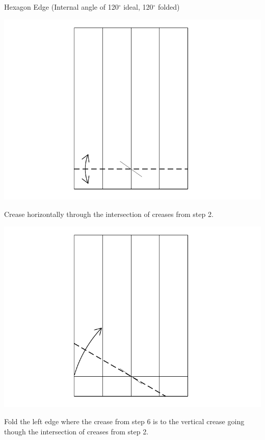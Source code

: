 \documentclass[11pt]{article}
\begin{document}
\newpage
{\Large Hexagon Edge} (Internal angle of 120$^\circ$ ideal, 120$^\circ$ folded)
\vspace*{0.25in}

\begin{minipage}[t]{0.45\textwidth}
  \includegraphics[width=\textwidth]{../figs/fig06-04}
  \begin{itemize}{\item[4.] Crease horizontally through the intersection of creases from step 2.}\end{itemize}
\end{minipage}
\hfill
\begin{minipage}[t]{0.45\textwidth}
  \includegraphics[width=\textwidth]{../figs/fig06-05}
  \begin{itemize}{\item[5.] Fold the left edge where the crease from step 6 is to the  vertical crease going though the intersection of creases from step 2.}\end{itemize}
\end{minipage}
\end{document}
